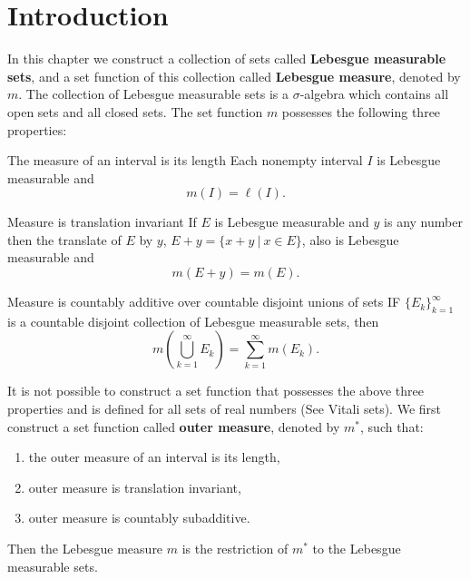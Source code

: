 \documentclass[a4paper,10pt]{book}
\theoremstyle{plain} %
\newcommand{\thistheoremname}{}
\newtheorem*{genericthm*}{\thistheoremname}
\newenvironment{namedthm*}[1]
	{\renewcommand{\thistheoremname}{#1}%
	\begin{genericthm*}}
	{\end{genericthm*}}
\begin{document}
\section{Introduction}
In this chapter we construct a collection of sets called \textbf{Lebesgue measurable sets}, and a set function of this collection called \textbf{Lebesgue measure}, denoted by $m$. The collection of Lebesgue measurable sets is a $\sigma$-algebra which contains all open sets and all closed sets. The set function $m$ possesses the following three properties:
\begin{namedthm*}{The measure of an interval is its length}
Each nonempty interval $I$ is Lebesgue measurable and 
\[
m(I) = \ell(I).
\]
\end{namedthm*}
\begin{namedthm*}{Measure is translation invariant}
If $E$ is Lebesgue measurable and $y$ is any number then the translate of $E$ by $y$, $E+y = \{x+y \ |\ x \in E\}$, also is Lebesgue measurable and
\[
m(E+y) = m(E).
\]
\end{namedthm*}
\begin{namedthm*}{Measure is countably additive over countable disjoint unions of sets}
IF $\{E_k\}_{k=1}^\infty$ is a countable disjoint collection of Lebesgue measurable sets, then
\[
m(\bigcup_{k=1}^\infty E_k) = \sum_{k=1}^\infty m(E_k).
\]
\end{namedthm*}
It is not possible to construct a set function that possesses the above three properties and is defined for all sets of real numbers (See Vitali sets).
We first construct a set function called \textbf{outer measure}, denoted by $m^*$, such that: 
\begin{enumerate}[label=(\roman*),align=left]
	\item the outer measure of an interval is its length,
	\item outer measure is translation invariant,
	\item outer measure is countably subadditive.
\end{enumerate}
Then the Lebesgue measure $m$ is the restriction of $m^*$ to the Lebesgue measurable sets.
\end{document}
